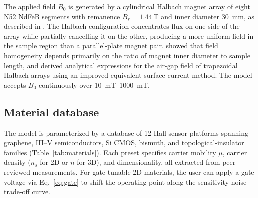 \documentclass[pdflatex,sn-basic]{sn-jnl}
\theoremstyle{thmstyleone}
\theoremstyle{thmstyletwo}
\theoremstyle{thmstylethree}
\begin{document}
The applied field $B_0$ is generated by a cylindrical Halbach magnet array of eight N52 NdFeB segments with remanence $B_r = \SI{1.44}{\tesla}$ and inner diameter \SI{30}{\milli\meter}, as described in \citet{govindaraju2025}. The Halbach configuration concentrates flux on one side of the array while partially cancelling it on the other, producing a more uniform field in the sample region than a parallel-plate magnet pair. \citet{klein2021} showed that field homogeneity depends primarily on the ratio of magnet inner diameter to sample length, and \citet{li2023halbach} derived analytical expressions for the air-gap field of trapezoidal Halbach arrays using an improved equivalent surface-current method. The model accepts $B_0$ continuously over \SIrange{10}{1000}{\milli\tesla}.

\subsection{Material database}\label{sec:materials}

The model is parameterized by a database of 12 Hall sensor platforms spanning graphene, III--V semiconductors, Si CMOS, bismuth, and topological-insulator families (Table~\ref{tab:materials}). Each preset specifies carrier mobility $\mu$, carrier density ($n_s$ for 2D or $n$ for 3D), and dimensionality, all extracted from peer-reviewed measurements. For gate-tunable 2D materials, the user can apply a gate voltage via Eq.~\eqref{eq:gate} to shift the operating point along the sensitivity-noise trade-off curve.
\end{document}
